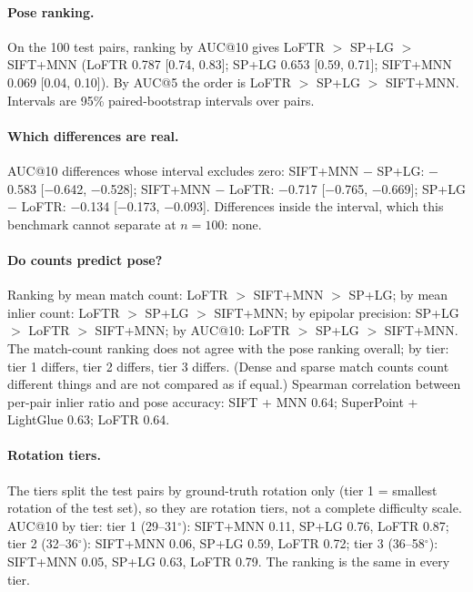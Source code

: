 \paragraph{Pose ranking.} On the 100 test pairs, ranking by AUC@10 gives LoFTR $>$ SP+LG $>$ SIFT+MNN (LoFTR 0.787 [0.74, 0.83]; SP+LG 0.653 [0.59, 0.71]; SIFT+MNN 0.069 [0.04, 0.10]). By AUC@5 the order is LoFTR $>$ SP+LG $>$ SIFT+MNN. Intervals are 95\% paired-bootstrap intervals over pairs.

\paragraph{Which differences are real.} AUC@10 differences whose interval excludes zero: SIFT+MNN $-$ SP+LG: $-$0.583 [$-$0.642, $-$0.528]; SIFT+MNN $-$ LoFTR: $-$0.717 [$-$0.765, $-$0.669]; SP+LG $-$ LoFTR: $-$0.134 [$-$0.173, $-$0.093]. Differences inside the interval, which this benchmark cannot separate at $n=100$: none.

\paragraph{Do counts predict pose?} Ranking by mean match count: LoFTR $>$ SIFT+MNN $>$ SP+LG; by mean inlier count: LoFTR $>$ SP+LG $>$ SIFT+MNN; by epipolar precision: SP+LG $>$ LoFTR $>$ SIFT+MNN; by AUC@10: LoFTR $>$ SP+LG $>$ SIFT+MNN. The match-count ranking does not agree with the pose ranking overall; by tier: tier 1 differs, tier 2 differs, tier 3 differs. (Dense and sparse match counts count different things and are not compared as if equal.) Spearman correlation between per-pair inlier ratio and pose accuracy: SIFT + MNN 0.64; SuperPoint + LightGlue 0.63; LoFTR 0.64.

\paragraph{Rotation tiers.} The tiers split the test pairs by ground-truth rotation only (tier 1 = smallest rotation of the test set), so they are rotation tiers, not a complete difficulty scale. AUC@10 by tier: tier 1 (29--31$^\circ$): SIFT+MNN 0.11, SP+LG 0.76, LoFTR 0.87; tier 2 (32--36$^\circ$): SIFT+MNN 0.06, SP+LG 0.59, LoFTR 0.72; tier 3 (36--58$^\circ$): SIFT+MNN 0.05, SP+LG 0.63, LoFTR 0.79. The ranking is the same in every tier.

